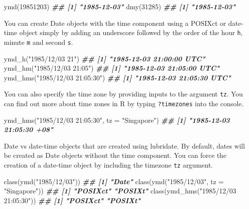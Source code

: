 \documentclass[
]{book}
\newenvironment{Shaded}{\begin{snugshade}}{\end{snugshade}}
\newcommand{\AttributeTok}[1]{\textcolor[rgb]{0.77,0.63,0.00}{#1}}
\newcommand{\DecValTok}[1]{\textcolor[rgb]{0.00,0.00,0.81}{#1}}
\newcommand{\DocumentationTok}[1]{\textcolor[rgb]{0.56,0.35,0.01}{\textbf{\textit{#1}}}}
\newcommand{\FunctionTok}[1]{\textcolor[rgb]{0.00,0.00,0.00}{#1}}
\newcommand{\NormalTok}[1]{#1}
\newcommand{\StringTok}[1]{\textcolor[rgb]{0.31,0.60,0.02}{#1}}
\begin{document}
\begin{Shaded}
\begin{Highlighting}[]
\FunctionTok{ymd}\NormalTok{(}\DecValTok{19851203}\NormalTok{)}
\DocumentationTok{\#\# [1] "1985{-}12{-}03"}
\FunctionTok{dmy}\NormalTok{(}\DecValTok{31285}\NormalTok{)}
\DocumentationTok{\#\# [1] "1985{-}12{-}03"}
\end{Highlighting}
\end{Shaded}

You can create Date objects with the time component using a POSIXct or date-time object simply by adding an underscore followed by the order of the hour \texttt{h}, minute \texttt{m} and second \texttt{s}.

\begin{Shaded}
\begin{Highlighting}[]
\FunctionTok{ymd\_h}\NormalTok{(}\StringTok{"1985/12/03 21"}\NormalTok{)}
\DocumentationTok{\#\# [1] "1985{-}12{-}03 21:00:00 UTC"}
\FunctionTok{ymd\_hm}\NormalTok{(}\StringTok{"1985/12/03 21:05"}\NormalTok{)}
\DocumentationTok{\#\# [1] "1985{-}12{-}03 21:05:00 UTC"}
\FunctionTok{ymd\_hms}\NormalTok{(}\StringTok{"1985/12/03 21:05:30"}\NormalTok{)}
\DocumentationTok{\#\# [1] "1985{-}12{-}03 21:05:30 UTC"}
\end{Highlighting}
\end{Shaded}

You can also specify the time zone by providing inputs to the argument \texttt{tz}. You can find out more about time zones in R by typing \texttt{?timezones} into the console.

\begin{Shaded}
\begin{Highlighting}[]
\FunctionTok{ymd\_hms}\NormalTok{(}\StringTok{"1985/12/03 21:05:30"}\NormalTok{, }\AttributeTok{tz =} \StringTok{"Singapore"}\NormalTok{)}
\DocumentationTok{\#\# [1] "1985{-}12{-}03 21:05:30 +08"}
\end{Highlighting}
\end{Shaded}

Date vs date-time objects that are created using lubridate. By default, dates will be created as Date objects without the time component. You can force the creation of a date-time object by including the timezone \texttt{tz} argument.

\begin{Shaded}
\begin{Highlighting}[]
\FunctionTok{class}\NormalTok{(}\FunctionTok{ymd}\NormalTok{(}\StringTok{"1985/12/03"}\NormalTok{))}
\DocumentationTok{\#\# [1] "Date"}
\FunctionTok{class}\NormalTok{(}\FunctionTok{ymd}\NormalTok{(}\StringTok{"1985/12/03"}\NormalTok{, }\AttributeTok{tz =} \StringTok{"Singapore"}\NormalTok{))}
\DocumentationTok{\#\# [1] "POSIXct" "POSIXt"}
\FunctionTok{class}\NormalTok{(}\FunctionTok{ymd\_hms}\NormalTok{(}\StringTok{"1985/12/03 21:05:30"}\NormalTok{))}
\DocumentationTok{\#\# [1] "POSIXct" "POSIXt"}
\end{Highlighting}
\end{Shaded}
\end{document}
